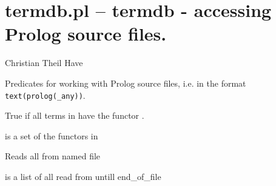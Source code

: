 


\section{termdb.pl -- termdb - accessing Prolog source files.}

\label{sec:termdb}

\begin{tags}
Christian Theil Have
\end{tags}

Predicates for working with Prolog source files, i.e. in the format \verb$text(prolog(_any))$.\vspace{0.7cm}

\begin{description}
True if all terms in  have the functor .

 is a set of the functors in 

Reads all  from named file 

 is a list of all  read from  untill end_of_file
\end{description}

